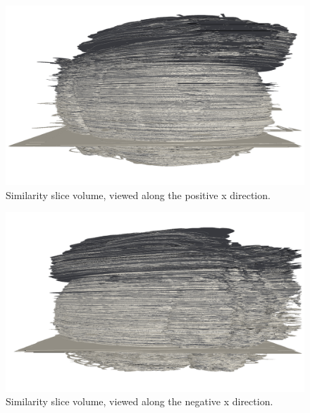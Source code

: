 	\begin{figure}
	  \centering
	  \includegraphics[width=0.9\textheight]{Ch6/Figs/Rat28/contours/whole_positive_x_size}
	  \caption{Similarity slice volume, viewed along the positive x direction.}
	  \label{fig:positive_x_similarity_contour}
	\end{figure}

	\begin{figure}
	  \centering
	  \includegraphics[width=0.9\textheight]{Ch6/Figs/Rat28/contours/whole_negative_x_size}
	  \caption{Similarity slice volume, viewed along the negative x direction.}
	  \label{fig:negative_x_similarity_contour}
	\end{figure}

